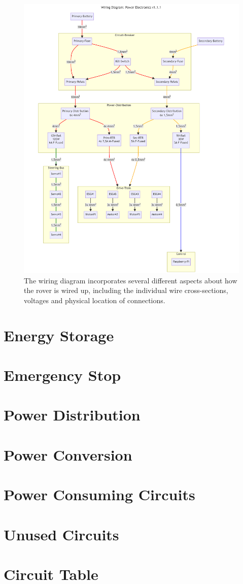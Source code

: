     \begin{figure}[ht!]
        \centering
        \includegraphics[width=1\textwidth]{contents/figures/wiring-diagram-p-v1.1.1.png}
        \caption{The wiring diagram incorporates several different aspects about how the rover is wired up, including the individual wire cross-sections, voltages and physical location of connections.}
        \label{wiring_power}
    \end{figure}

    \clearpage %


\section{Energy Storage}

\section{Emergency Stop}

\section{Power Distribution}

\section{Power Conversion}

\section{Power Consuming Circuits}

\section{Unused Circuits}

\section{Circuit Table}

